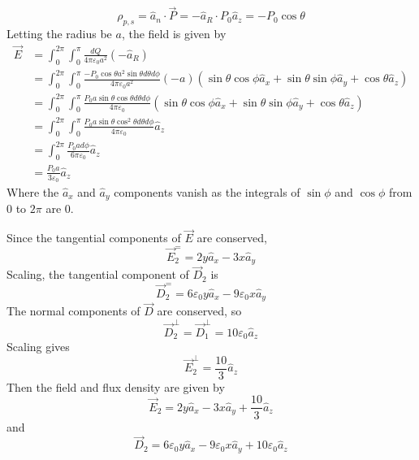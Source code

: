 \documentclass[answers]{exam}
\begin{document}
\begin{questions}
\begin{solution}
	$$\rho_{p,s} = \hat{a}_n \cdot \vec{P} = -\hat{a}_R \cdot P_0\hat{a}_z = -P_0\cos\theta$$
	Letting the radius be $a$, the field is given by
	\begin{align*}
		\vec{E} &= \int_0^{2\pi} \int_0^\pi \frac{dQ}{4\pi\varepsilon_0a^2}(-\hat{a}_R) \\
			&= \int_0^{2\pi} \int_0^\pi \frac{-P_0\cos\theta a^2 \sin\theta d\theta d\phi}{4\pi\varepsilon_0a^2}(-a)(\sin\theta\cos\phi \hat{a}_x + \sin\theta\sin\phi \hat{a}_y + \cos\theta \hat{a}_z) \\
			&= \int_0^{2\pi} \int_0^\pi \frac{P_0a\sin\theta\cos\theta d\theta d\phi}{4\pi\varepsilon_0}(\sin\theta\cos\phi \hat{a}_x + \sin\theta\sin\phi \hat{a}_y + \cos\theta \hat{a}_z) \\
			&= \int_0^{2\pi} \int_0^\pi \frac{P_0a\sin\theta\cos^2\theta d\theta d\phi}{4\pi\varepsilon_0}\hat{a}_z \\
			&= \int_0^{2\pi} \frac{P_0a d\phi}{6\pi\varepsilon_0}\hat{a}_z \\
			&= \frac{P_0a}{3\varepsilon_0}\hat{a}_z
	\end{align*}
	Where the $\hat{a}_x$ and $\hat{a}_y$ components vanish as the integrals of $\sin\phi$ and $\cos\phi$ from $0$ to $2\pi$ are 0.
\end{solution}


\begin{solution}
	Since the tangential components of $\vec{E}$ are conserved,
	$$\vec{E}_2^= = 2y\hat{a}_x - 3x\hat{a}_y$$
	Scaling, the tangential component of $\vec{D}_2$ is
	$$\vec{D}_2^= = 6\varepsilon_0y\hat{a}_x - 9\varepsilon_0x\hat{a}_y$$
	The normal components of $\vec{D}$ are conserved, so
	$$\vec{D}_2^\perp = \vec{D}_1^\perp = 10\varepsilon_0\hat{a}_z$$
	Scaling gives
	$$\vec{E}_2^\perp = \frac{10}{3}\hat{a}_z$$
	Then the field and flux density are given by
	$$\vec{E}_2 = 2y\hat{a}_x - 3x\hat{a}_y + \frac{10}{3}\hat{a}_z$$
	and
	$$\vec{D}_2 = 6\varepsilon_0y\hat{a}_x - 9\varepsilon_0x\hat{a}_y + 10\varepsilon_0\hat{a}_z$$
\end{solution}



\end{questions}
\end{document}
